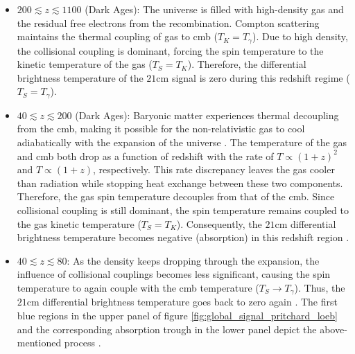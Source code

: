 \documentclass[12pt, TexShade, letterpaper]{report}
\begin{document}
\begin{itemize}
\item $200 \lesssim z \lesssim 1100$ (Dark Ages): The universe is filled with high-density gas and the residual free electrons from the recombination. Compton scattering maintains the thermal coupling of gas to \gls{cmb} ($T_K = T_\gamma$). Due to high density, the collisional coupling is dominant, forcing the spin temperature to the kinetic temperature of the gas ($T_S = T_K$). 
Therefore, the differential brightness temperature of the $\mathrm{21cm}$ signal is zero during this redshift regime ($T_S = T_\gamma$)\cite{21century}.\par

\item $40 \lesssim z \lesssim 200$ (Dark Ages): Baryonic matter experiences thermal decoupling from the \gls{cmb}, making it possible for the non-relativistic gas to cool adiabatically with the expansion of the universe \cite{21century}. The temperature of the gas and \gls{cmb} both drop as a function of redshift with the rate of $T\propto (1+z)^{2}$ and $T\propto (1+z)$, respectively. This rate discrepancy leaves the gas cooler than radiation while stopping heat exchange between these two components. Therefore, the gas spin temperature decouples from that of the \gls{cmb}. Since collisional coupling is still dominant, the spin temperature remains coupled to the gas kinetic temperature ($T_S = T_K$). Consequently, the $\mathrm{21cm}$ differential brightness temperature becomes negative (absorption) in this redshift region \cite{map_universe, 21century}.\par

\item $40 \lesssim z \lesssim 80$: As the density keeps dropping through the expansion, the influence of collisional couplings becomes less significant, causing the spin temperature to again couple with the \gls{cmb} temperature ($T_S \rightarrow T_\gamma$). Thus, the $\mathrm{21cm}$ differential brightness temperature goes back to zero again \cite{map_universe}. The first blue regions in the upper panel of figure \ref{fig:global_signal_pritchard_loeb} and the corresponding absorption trough in the lower panel depict the above-mentioned process \cite{map_universe, 21century}.\par


\end{itemize}
\end{document}

